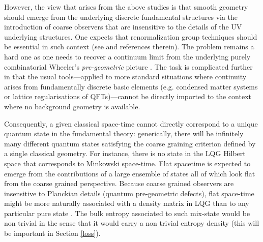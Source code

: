 \documentclass[aps, nofootinbib,superscriptaddress,12pt]{revtex4-2}
\begin{document}
However, the view that arises from the above studies is that smooth  geometry should emerge  from the underlying discrete fundamental structures via the introduction of coarse observers that are insensitive to the details of the UV underlying structures. 
One expects that renormalization group techniques should be essential in such context (see \cite{Dittrich:2014ala} and references therein). The problem remains a hard one as one needs to recover a continuum limit from the underlying purely combinatorial Wheeler's {\em pre-geometric} picture \cite{Misner:1974qy}. The task is complicated further in that the usual tools---applied to more standard situations where continuity arises from fundamentally discrete basic elements (e.g. condensed matter systems or lattice regularisations of QFTs)---cannot be directly imported to the context where no background geometry is available.  

Consequently, a given classical space-time cannot directly correspond to a unique quantum state in the fundamental theory: generically, there will be infinitely many different quantum states satisfying the coarse graining criterion defined by a single classical geometry. For instance, there is no state in the LQG Hilbert space that corresponds to Minkowski space-time. Flat spacetime is expected to emerge from the contributions of a large ensemble of states all of which look flat from the coarse grained perspective. Because coarse grained observers are insensitive to Planckian details (quantum pre-geometric defects), flat space-time might be more naturally associated with a density matrix in LQG than to any particular pure state \cite{Livine:2007sy, Ariwahjoedi:2014wpa}.  The bulk entropy associated to such mix-state would be non trivial  in the sense that it would carry a non trivial entropy density (this will be important in Section \ref{loss}).
\end{document}
